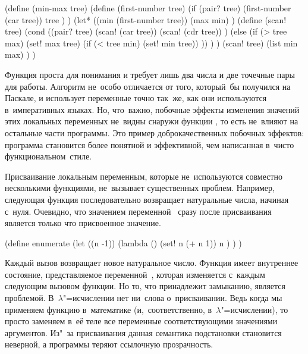 \begin{code:lisp}
(define (min-max tree)
  (define (first-number tree)
    (if (pair? tree)
        (first-number (car tree))
        tree ) )
  (let* ((min (first-number tree))
         (max min) )
    (define (scan! tree)
      (cond ((pair? tree)
             (scan! (car tree))
             (scan! (cdr tree)) )
            (else (if (> tree max) (set! max tree)
                      (if (< tree min) (set! min tree)) )) ) )
    (scan! tree)
    (list min max) ) )
\end{code:lisp}

Функция  проста для понимания и требует лишь два числа и две
точечные пары для работы. Алгоритм не~особо отличается от того, который~бы
получился на Паскале, и использует переменные точно так~же, как они используются
в~императивных языках. Но, что~важно, побочные эффекты изменения значений этих
локальных переменных не~видны снаружи функции , то есть не~влияют
на остальные части программы. Это пример доброкачественных побочных эффектов:
программа становится более понятной и эффективной, чем написанная в~чисто
функциональном~стиле. 

Присваивание локальным переменным, которые не~используются совместно несколькими
функциями, не~вызывает существенных проблем. Например, следующая функция
последовательно возвращает натуральные числа, начиная с~нуля. Очевидно, что
значением переменной~ сразу после присваивания является только что
присвоенное значение.

\begin{code:lisp}
(define enumerate
  (let ((n -1))
    (lambda () (set! n (+ n 1))
               n ) ) )
\end{code:lisp}

Каждый вызов  возвращает новое натуральное число. Функция
 имеет внутреннее состояние, представляемое переменной~,
которая изменяется с~каждым следующим вызовом функции. Но то, что 
принадлежит замыканию, является проблемой. В~$\lambda$"=исчислении нет ни~слова
о~присваивании. Ведь когда мы применяем функцию в~математике (и,~соответственно,
в~$\lambda$"=исчислении), то просто заменяем в~её теле все переменные
соответствующими значениями аргументов. Из"~за присваивания данная семантика
подстановки становится неверной, а программы теряют ссылочную прозрачность.

